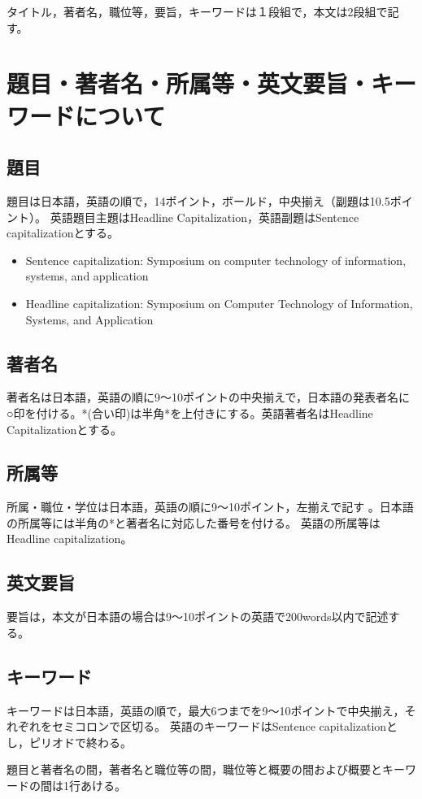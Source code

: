 \documentclass[base=10pt,magstyle=real,a4paper,twocolumn,xelatex,pandoc,jafont=noto]{bxjsarticle}%
\begin{document}
タイトル，著者名，職位等，要旨，キーワードは１段組で，本文は2段組で記す。


\section{題目・著者名・所属等・英文要旨・キーワードについて}
\subsection{題目}
題目は日本語，英語の順で，14ポイント，ボールド，中央揃え（副題は10.5ポイント）。
英語題目主題はHeadline Capitalization，英語副題はSentence capitalizationとする。
\begin{itemize}
	\item Sentence capitalization: Symposium on computer technology of information, systems, and application 
	\item Headline capitalization: Symposium on Computer Technology of Information, Systems, and Application
\end{itemize}

\subsection{著者名}
著者名は日本語，英語の順に9～10ポイントの中央揃えで，日本語の発表者名に○印を付ける。*(合い印)は半角*を上付きにする。英語著者名はHeadline Capitalizationとする。

\subsection{所属等}
所属・職位・学位は日本語，英語の順に9～10ポイント，左揃えで記す
。日本語の所属等には半角の*と著者名に対応した番号を付ける。
英語の所属等はHeadline capitalization。

\subsection{英文要旨}
要旨は，本文が日本語の場合は9～10ポイントの英語で200words以内で記述する。

\subsection{キーワード}
キーワードは日本語，英語の順で，最大6つまでを9～10ポイントで中央揃え，それぞれをセミコロンで区切る。
英語のキーワードはSentence capitalizationとし，ピリオドで終わる。

題目と著者名の間，著者名と職位等の間，職位等と概要の間および概要とキーワードの間は1行あける。
\end{document}
